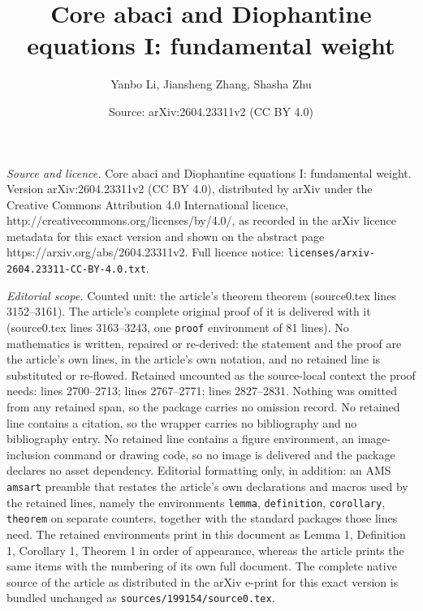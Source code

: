 \documentclass[10pt,a4paper]{amsart}
\title{Core abaci and Diophantine equations I: fundamental weight}
\author{Yanbo Li, Jiansheng Zhang, Shasha Zhu}
\date{Source: arXiv:2604.23311v2 (CC BY 4.0)}
\begin{document}
\maketitle

\noindent\emph{Source and licence.} Core abaci and Diophantine equations I: fundamental weight. Version arXiv:2604.23311v2 (CC BY 4.0), distributed by arXiv under the Creative Commons Attribution 4.0 International licence, http://creativecommons.org/licenses/by/4.0/, as recorded in the arXiv licence metadata for this exact version and shown on the abstract page https://arxiv.org/abs/2604.23311v2. Full licence notice: \texttt{licenses/arxiv-2604.23311-CC-BY-4.0.txt}.\par\smallskip

\noindent\textit{Editorial scope.} Counted unit: the article's theorem theorem (source0.tex lines 3152--3161). The article's complete original proof of it is delivered with it (source0.tex lines 3163--3243, one \texttt{proof} environment of 81 lines). No mathematics is written, repaired or re-derived: the statement and the proof are the article's own lines, in the article's own notation, and no retained line is substituted or re-flowed.  Retained uncounted as the source-local context the proof needs: lines 2700--2713; lines 2767--2771; lines 2827--2831.  Nothing was omitted from any retained span, so the package carries no omission record.  No retained line contains a citation, so the wrapper carries no bibliography and no bibliography entry.  No retained line contains a figure environment, an image-inclusion command or drawing code, so no image is delivered and the package declares no asset dependency.  Editorial formatting only, in addition: an AMS \texttt{amsart} preamble that restates the article's own declarations and macros used by the retained lines, namely the environments \texttt{lemma}, \texttt{definition}, \texttt{corollary}, \texttt{theorem} on separate counters, together with the standard packages those lines need.  The retained environments print in this document as Lemma 1, Definition 1, Corollary 1, Theorem 1 in order of appearance, whereas the article prints the same items with the numbering of its own full document.  The complete native source of the article as distributed in the arXiv e-print for this exact version is bundled unchanged as \texttt{sources/199154/source0.tex}.
\end{document}
